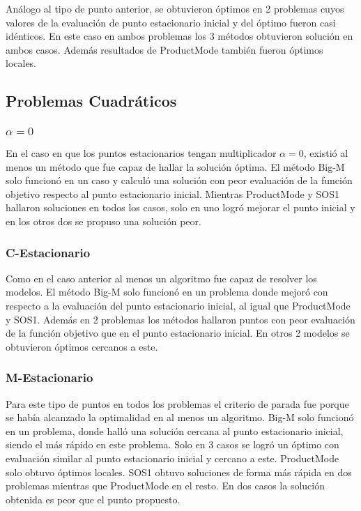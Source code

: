Análogo al tipo de punto anterior, se obtuvieron óptimos en 2 problemas 
cuyos valores de la evaluación de punto estacionario inicial y del óptimo fueron casi idénticos. 
En este caso en ambos problemas los 3 métodos obtuvieron solución en ambos casos. 
 Además resultados de ProductMode también fueron óptimos locales.



\subsection{Problemas Cuadráticos}


\subsubsection{$\alpha =0$}
En el caso en que los puntos estacionarios tengan multiplicador $\alpha=0$, 
existió al menos un método que fue capaz de hallar la solución óptima. 
El método Big-M solo funcionó en un caso y calculó una solución con peor 
evaluación de la función objetivo respecto al punto estacionario inicial. 
Mientras ProductMode y SOS1 hallaron soluciones en todos los casos, 
solo en uno logró mejorar el punto inicial y en los otros dos se propuso una solución peor.
\subsubsection{C-Estacionario}   
Como en  el caso anterior al menos un algoritmo fue capaz de resolver los modelos. 
El método Big-M solo funcionó en un problema donde mejoró con respecto a la evaluación del punto estacionario inicial, al igual que  ProductMode y SOS1. Además en 2 problemas los métodos hallaron puntos con peor evaluación de la función objetivo que en el punto estacionario inicial. En otros 2 modelos se obtuvieron óptimos cercanos a este.



    
\subsubsection{M-Estacionario}
  
Para este tipo de puntos en todos los problemas el criterio de parada fue porque se había alcanzado la optimalidad en al menos un 
algoritmo.
Big-M solo funcionó en un problema, donde halló una solución cercana al punto estacionario inicial, siendo el más rápido 
en este problema. Solo en 3 casos  se logró  un óptimo con evaluación  similar al punto estacionario inicial  y  cercano a este. 
ProductMode solo obtuvo óptimos locales. SOS1 obtuvo soluciones de forma más rápida en dos problemas mientras que ProductMode en el 
resto. En dos casos la solución obtenida es peor que el punto propuesto.
    
